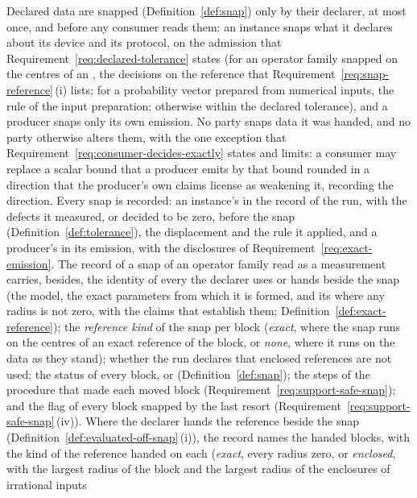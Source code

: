 \begin{requirement}\label{req:who-snaps}
Declared data are snapped (Definition~\ref{def:snap}) only by their declarer,
at most once, and before any consumer reads them: an instance snaps what it
declares about its device and its protocol, on the admission that
Requirement~\ref{req:declared-tolerance} states (for an operator family
snapped on the centres of an , the decisions on the
reference that Requirement~\ref{req:snap-reference}\,(i) lists; for a
probability vector prepared from numerical inputs, the rule of the input
preparation; otherwise within the declared tolerance), and a producer snaps
only its own emission. No party snaps data it was handed, and no party
otherwise alters them, with the one exception that
Requirement~\ref{req:consumer-decides-exactly} states and limits: a consumer
may replace a scalar bound that a producer emits by that bound rounded in a
direction that the producer's own claims license as weakening it, recording
the direction. Every snap is recorded: an instance's in the record of the run,
with the defects it measured, or decided to be zero, before the snap
(Definition~\ref{def:tolerance}),
the displacement and the rule it applied, and a producer's in its emission,
with the disclosures of Requirement~\ref{req:exact-emission}. The record of a
snap of an operator family read as a measurement carries, besides, the
identity of every  the declarer uses or hands beside the snap
(the model, the exact parameters from which it is formed, and its
 where any radius is not
zero, with the claims that establish them;
Definition~\ref{def:exact-reference}); the \emph{reference kind} of the snap
per block (\emph{exact}, where the snap runs on the centres of an exact
reference of the block, or \emph{none}, where it runs on the data as they
stand); whether the run declares that enclosed references are not used; the
status of every block,  or 
(Definition~\ref{def:snap}); the steps of the procedure that made each moved
block (Requirement~\ref{req:support-safe-snap}); and the flag
 of every block snapped by the last resort
(Requirement~\ref{req:support-safe-snap}\,(iv)). Where the declarer hands the
reference beside the snap (Definition~\ref{def:evaluated-off-snap}\,(i)), the
record names the handed blocks, with the kind of the reference handed on each
(\emph{exact}, every radius zero, or \emph{enclosed}, with the largest radius
of the block and the largest radius of the enclosures of irrational inputs

\end{requirement}
